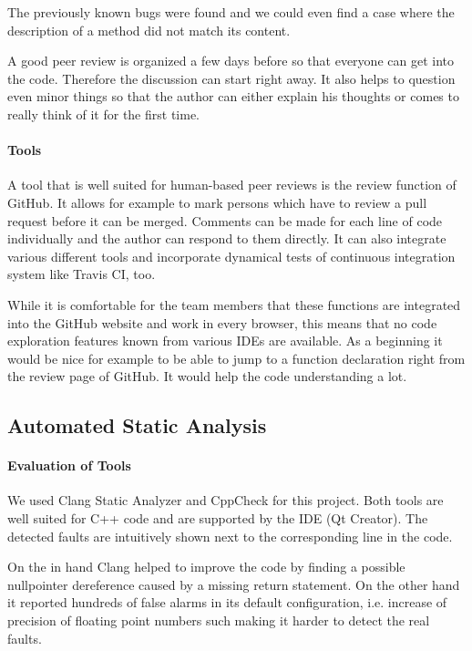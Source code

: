 \documentclass{scrartcl}
\begin{document}
The previously known bugs were found and we could even find a case where the description of a method did not match its content.

A good peer review is organized a few days before so that everyone can get into the code. Therefore the discussion can start right away. It also helps to question even minor things so that the author can either explain his thoughts or comes to really think of it for the first time.

\paragraph{Tools}

A tool that is well suited for human-based peer reviews is the review function of GitHub. It allows for example to mark persons which have to review a pull request before it can be merged. Comments can be made for each line of code individually and the author can respond to them directly. It can also integrate various different tools and incorporate dynamical tests of continuous integration system like Travis CI, too.

While it is comfortable for the team members that these functions are integrated into the GitHub website and work in every browser, this means that no code exploration features known from various IDEs are available. As a beginning it would be nice for example to be able to jump to a function declaration right from the review page of GitHub. It would help the code understanding a lot.

\subsection{Automated Static Analysis}

\paragraph{Evaluation of Tools}

We used Clang Static Analyzer and CppCheck for this project.
Both tools are well suited for C++ code and are supported by the IDE (Qt Creator). The detected faults are intuitively shown next to the corresponding line in the code.

On the in hand Clang helped to improve the code by finding a possible nullpointer dereference caused by a missing return statement. On the other hand it reported hundreds of false alarms in its default configuration, i.e. increase of precision of floating point numbers such making it harder to detect the real faults.
\end{document}

